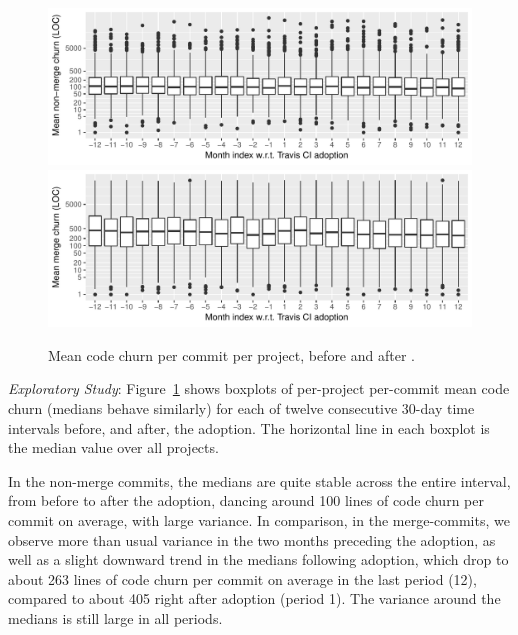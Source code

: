 \begin{figure}[t]
\centering
\includegraphics[width=\columnwidth, clip=true, trim=0 0 0 0]{figures/churn-non-merge.pdf}
\includegraphics[width=\columnwidth, clip=true, trim=0 0 0 0]{figures/churn-merge.pdf}
\caption{Mean code churn per commit per project, before and after \Tvi.}
\label{fig:churn}
\end{figure}

\smallskip\noindent \emph{Exploratory Study}: 
Figure~\ref{fig:churn} shows boxplots of per-project per-commit mean code 
churn (medians behave similarly) for each of twelve consecutive 30-day time 
intervals before, and after, the \Tvis adoption.
The horizontal line in each boxplot is the median value over all projects.

In the non-merge commits, the medians are quite stable
across the entire interval, from before to after the \Tvis adoption, dancing 
around 100 
lines of code churn per commit on average, with large variance.
In comparison, in the merge-commits, we observe more than usual variance
in the two months preceding the adoption, as well as a slight downward trend 
in the medians following adoption, which drop to about 263 lines of code churn 
per commit on average in the last period (12), compared to about 405 right after 
adoption (period 1).
The variance around the medians is still large in all periods.

